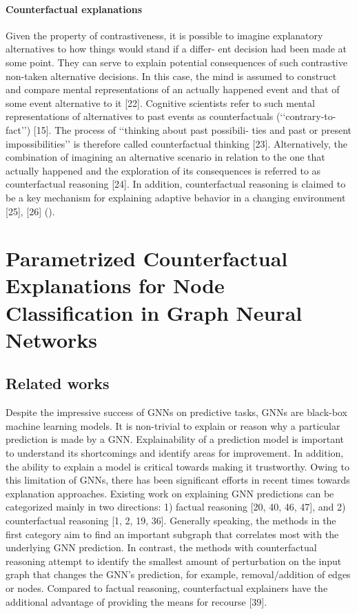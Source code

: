 \documentclass[binding=0.6cm]{sapthesis}
\newcommand{\mycite}[1]{(\cite{#1})}
\begin{document}
\subsubsection{Counterfactual explanations}
\label{sec:bg.xai.counterfactual}
Given the property of contrastiveness, it is possible to imagine
explanatory alternatives to how things would stand if a differ-
ent decision had been made at some point. They can serve to
explain potential consequences of such contrastive non-taken
alternative decisions. In this case, the mind is assumed to
construct and compare mental representations of an actually
happened event and that of some event alternative to it [22].
Cognitive scientists refer to such mental representations of
alternatives to past events as counterfactuals (‘‘contrary-to-
fact’’) [15]. The process of ‘‘thinking about past possibili-
ties and past or present impossibilities’’ is therefore called
counterfactual thinking [23]. Alternatively, the combination
of imagining an alternative scenario in relation to the one that
actually happened and the exploration of its consequences
is referred to as counterfactual reasoning [24]. In addition,
counterfactual reasoning is claimed to be a key mechanism
for explaining adaptive behavior in a changing environment
[25], [26] \mycite{stepin2021-xai-cf-contrative-survey}.






\chapter[CFPGExplainer]{Parametrized Counterfactual Explanations for Node Classification in Graph Neural Networks}
\label{chap:3-CFPG}

\section{Related works}
\label{sec:cfpg.bg}
Despite the impressive success of GNNs on predictive tasks, GNNs are black-box machine learning models. It is non-trivial to explain or reason why a particular prediction is made by a GNN. Explainability of a prediction model is important to understand its shortcomings and identify areas for improvement. In addition, the ability to explain a model is critical towards making it trustworthy. Owing to this limitation of GNNs, there has been significant efforts in recent times towards explanation approaches. Existing work on explaining GNN predictions can be categorized mainly in two directions: 1) factual reasoning [20, 40, 46, 47], and 2) counterfactual reasoning [1, 2, 19, 36]. Generally speaking, the methods in the first category aim to find an important subgraph that correlates most with the underlying GNN prediction. In contrast, the methods with counterfactual reasoning attempt to identify the smallest amount of perturbation on the input graph that changes the GNN’s prediction, for example, removal/addition of edges or nodes. Compared to factual reasoning, counterfactual explainers have the additional advantage of providing the means for recourse [39].
\end{document}
